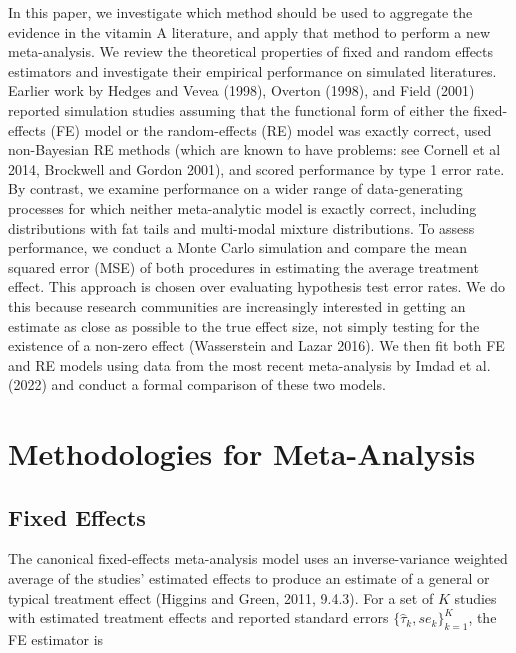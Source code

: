 \documentclass[12pt]{article}
\begin{document}
In this paper, we investigate which method should be used to aggregate the evidence in the vitamin A literature, and apply that method to perform a new meta-analysis. We review the theoretical properties of fixed and random effects estimators and investigate their empirical performance on simulated literatures. 
Earlier work by Hedges and Vevea (1998), Overton (1998), and Field (2001) reported simulation studies assuming that the functional form of either the fixed-effects (FE) model or the random-effects (RE) model was exactly correct, used non-Bayesian RE methods (which are known to have problems: see Cornell et al 2014, Brockwell and Gordon 2001), and scored performance by type 1 error rate. By contrast, we examine performance on a wider range of data-generating processes for which neither meta-analytic model is exactly correct, including distributions with fat tails and multi-modal mixture distributions. To assess performance, we conduct a Monte Carlo simulation and compare the mean squared error (MSE) of both procedures in estimating the average treatment effect. This approach is chosen over evaluating hypothesis test error rates. We do this because research communities are increasingly interested in getting an estimate as close as possible to the true effect size, not simply testing for the existence of a non-zero effect (Wasserstein and Lazar 2016). We then fit both FE and RE models using data from the most recent meta-analysis by Imdad et al. (2022) and conduct a formal comparison of these two models.



\section{Methodologies for Meta-Analysis}

\subsection{Fixed Effects}

The canonical fixed-effects meta-analysis model uses an inverse-variance weighted average of the studies' estimated effects to produce an estimate of a general or typical treatment effect (Higgins and Green, 2011, 9.4.3). For a set of $K$ studies with estimated treatment effects and reported standard errors  $\{\hat{\tau}_k, se_k\}_{k=1}^K$, the FE estimator is
\end{document}
